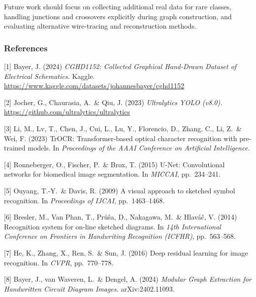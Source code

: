 \documentclass{article}
\begin{document}
Future work should focus on collecting additional real data for rare classes, handling junctions and crossovers explicitly during graph construction, and evaluating alternative wire-tracing and reconstruction methods.
\subsubsection*{References}

\small{
[1] Bayer, J. (2024) \textit{CGHD1152: Collected Graphical Hand-Drawn Dataset of Electrical Schematics.} Kaggle. \url{https://www.kaggle.com/datasets/johannesbayer/cghd1152}

[2] Jocher, G., Chaurasia, A.\ \& Qiu, J. (2023) \textit{Ultralytics YOLO (v8.0).} \url{https://github.com/ultralytics/ultralytics}

[3] Li, M., Lv, T., Chen, J., Cui, L., Lu, Y., Florencio, D., Zhang, C., Li, Z.\ \& Wei, F. (2023) TrOCR: Transformer-based optical character recognition with pre-trained models. In \textit{Proceedings of the AAAI Conference on Artificial Intelligence.}

[4] Ronneberger, O., Fischer, P.\ \& Brox, T. (2015) U-Net: Convolutional networks for biomedical image segmentation. In \textit{MICCAI}, pp.\ 234--241.

[5] Ouyang, T.-Y.\ \& Davis, R. (2009) A visual approach to sketched symbol recognition. In \textit{Proceedings of IJCAI}, pp.\ 1463--1468.

[6] Bresler, M., Van Phan, T., Pr\r{u}\v{s}a, D., Nakagawa, M.\ \& Hlav\'{a}\v{c}, V. (2014) Recognition system for on-line sketched diagrams. In \textit{14th International Conference on Frontiers in Handwriting Recognition (ICFHR)}, pp.\ 563--568.

[7] He, K., Zhang, X., Ren, S.\ \& Sun, J. (2016) Deep residual learning for image recognition. In \textit{CVPR}, pp.\ 770--778.

[8] Bayer, J., van Waveren, L.\ \& Dengel, A. (2024) \textit{Modular Graph Extraction for Handwritten Circuit Diagram Images.} arXiv:2402.11093.
}
\end{document}

